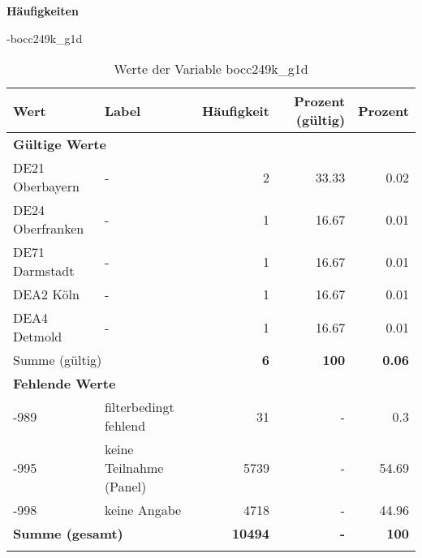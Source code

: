         		\vspace*{0.5cm}
                \noindent\textbf{Häufigkeiten}

                \vspace*{-\baselineskip}
					\begin{filecontents}{\jobname-bocc249k_g1d}
					\begin{longtable}{Xlrrr}
					\toprule
					\textbf{Wert} & \textbf{Label} & \textbf{Häufigkeit} & \textbf{Prozent (gültig)} & \textbf{Prozent} \\
					\endhead
					\midrule
					\multicolumn{5}{l}{\textbf{Gültige Werte}}\\

					\multicolumn{1}{X}{DE21 Oberbayern} &
					- &
					\num{2} &
					\num[round-mode=places,round-precision=2]{33.33} &
					\num[round-mode=places,round-precision=2]{0.02} \\
					
					\multicolumn{1}{X}{DE24 Oberfranken} &
					- &
					\num{1} &
					\num[round-mode=places,round-precision=2]{16.67} &
					\num[round-mode=places,round-precision=2]{0.01} \\
					
					\multicolumn{1}{X}{DE71 Darmstadt} &
					- &
					\num{1} &
					\num[round-mode=places,round-precision=2]{16.67} &
					\num[round-mode=places,round-precision=2]{0.01} \\
					
					\multicolumn{1}{X}{DEA2 Köln} &
					- &
					\num{1} &
					\num[round-mode=places,round-precision=2]{16.67} &
					\num[round-mode=places,round-precision=2]{0.01} \\
					
					\multicolumn{1}{X}{DEA4 Detmold} &
					- &
					\num{1} &
					\num[round-mode=places,round-precision=2]{16.67} &
					\num[round-mode=places,round-precision=2]{0.01} \\
					\midrule
						\multicolumn{2}{l}{Summe (gültig)} & \textbf{\num{6}} &
						\textbf{\num{100}} &
					    \textbf{\num[round-mode=places,round-precision=2]{0.06}} \\
					\multicolumn{5}{l}{\textbf{Fehlende Werte}}\\
							-989 & filterbedingt fehlend & \num{31} & - & \num[round-mode=places,round-precision=2]{0.3} \\

							-995 & keine Teilnahme (Panel) & \num{5739} & - & \num[round-mode=places,round-precision=2]{54.69} \\

							-998 & keine Angabe & \num{4718} & - & \num[round-mode=places,round-precision=2]{44.96} \\

					\midrule
					\multicolumn{2}{l}{\textbf{Summe (gesamt)}} & \textbf{\num{10494}} & \textbf{-} & \textbf{\num{100}} \\
					\bottomrule
					\caption{Werte der Variable bocc249k\_g1d}
					\end{longtable}
					\end{filecontents}

